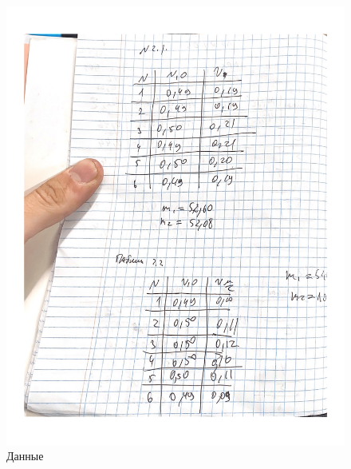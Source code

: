 \documentclass[a4paper]{article}
\begin{document}
\begin{figure}[H]
\includegraphics[width=\textwidth, scale=0.5]{1-2.png}
\caption{Данные}
\end{figure}
\end{document}
